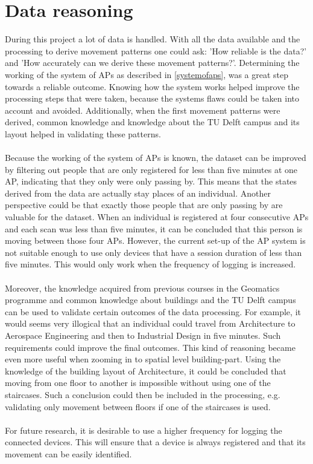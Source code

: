 \section{Data reasoning}
During this project a lot of data is handled. With all the data available and the processing to derive movement patterns one could ask: 'How reliable is the data?' and 'How accurately can we derive these movement patterns?'. Determining the working of the system of APs as described in \autoref{systemofaps}, was a great step towards a reliable outcome. Knowing how the system works helped improve the processing steps that were taken, because the systems flaws could be taken into account and avoided. Additionally, when the first movement patterns were derived, common knowledge and knowledge about the TU Delft campus and its layout helped in validating these patterns.\\\\
Because the working of the system of APs is known, the dataset can be improved by filtering out people that are only registered for less than five minutes at one AP, indicating that they only were only passing by. This means that the states derived from the data are actually stay places of an individual. Another perspective could be that exactly those people that are only passing by are valuable for the dataset. When an individual is registered at four consecutive APs and each scan was less than five minutes, it can be concluded that this person is moving between those four APs. However, the current set-up of the AP system is not suitable enough to use only devices that have a session duration of less than five minutes. This would only work when the frequency of logging is increased.\\\\
Moreover, the knowledge acquired from previous courses in the Geomatics programme and common knowledge about buildings and the TU Delft campus can be used to validate certain outcomes of the data processing. For example, it would seems very illogical that an individual could travel from Architecture to Aerospace Engineering and then to Industrial Design in five minutes. Such requirements could improve the final outcomes. This kind of reasoning became even more useful when zooming in to spatial level building-part. Using the knowledge of the building layout of Architecture, it could be concluded that moving from one floor to another is impossible without using one of the staircases. Such a conclusion could then be included in the processing, e.g. validating only movement between floors if one of the staircases is used. \\\\
For future research, it is desirable to use a higher frequency for logging the connected devices. This will ensure that a device is always registered and that its movement can be easily identified. 

